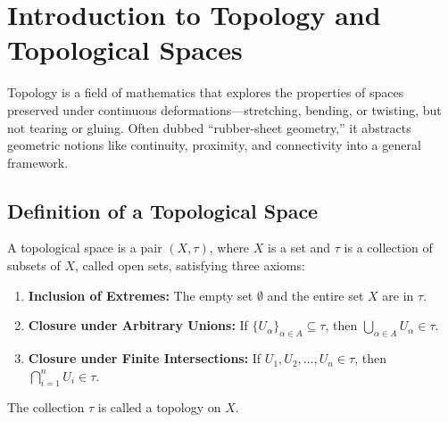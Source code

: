 \section{Introduction to Topology and Topological Spaces}

Topology is a field of mathematics that explores the properties of spaces preserved under continuous deformations—stretching, bending, or twisting, but not tearing or gluing. Often dubbed ``rubber-sheet geometry,'' it abstracts geometric notions like continuity, proximity, and connectivity into a general framework.

\subsection{Definition of a Topological Space}

\begin{definition}
A topological space is a pair $(X,\tau)$, where $X$ is a set and $\tau$ is a collection of subsets of $X$, called open sets, satisfying three axioms:
\begin{enumerate}
    \item \textbf{Inclusion of Extremes:} The empty set $\emptyset$ and the entire set $X$ are in $\tau$.
    \item \textbf{Closure under Arbitrary Unions:} If $\{U_\alpha\}_{\alpha \in A} \subseteq \tau$, then $\bigcup_{\alpha \in A} U_\alpha \in \tau$.
    \item \textbf{Closure under Finite Intersections:} If $U_1, U_2, \ldots, U_n \in \tau$, then $\bigcap_{i=1}^n U_i \in \tau$.
\end{enumerate}
The collection $\tau$ is called a topology on $X$.
\end{definition}

